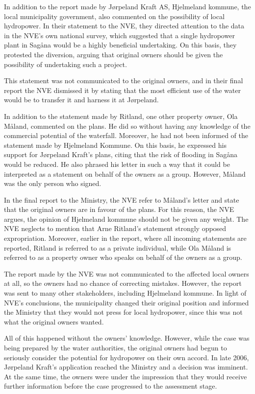 In addition to the report made by Jørpeland Kraft AS, Hjelmeland kommune, the local municipality government, also commented on the possibility of local hydropower. In their statement to the NVE, they directed attention to the data in the NVE's own national survey, which suggested that a single hydropower plant in Sagåna would be a highly beneficial undertaking. On this basis, they protested the diversion, arguing that original owners should be given the possibility of undertaking such a project. 

This statement was not communicated to the original owners, and in their final report the NVE dismissed it by stating that the most efficient use of the water would be to transfer it and harness it at Jørpeland.

In addition to the statement made by Ritland, one other property owner, Ola Måland, commented on the plans. He did so without having any knowledge of the commercial potential of the waterfall. Moreover, he had not been informed of the statement made by Hjelmeland Kommune. On this basis, he expressed his support for Jørpeland Kraft's plans, citing that the risk of flooding in Sagåna would be reduced. He also phrased his letter in such a way that it could be interpreted as a statement on behalf of the owners as a group. However, Måland was the only person who signed.

In the final report to the Ministry, the NVE refer to Måland's letter and state that the original owners are in favour of the plans. For this reason, the NVE argues, the opinion of Hjelmeland kommune should not be given any weight. The NVE neglects to mention that Arne Ritland's statement strongly opposed expropriation. Moreover, earlier in the report, where all incoming statements are reported, Ritland is referred to as a private individual, while Ola Måland is referred to as a property owner who speaks on behalf of the owners as a group.

The report made by the NVE was not communicated to the affected local owners at all, so the owners had no chance of correcting mistakes. However, the report was sent to many other stakeholders, including Hjelmeland kommune. In light of NVE's conclusions, the municipality changed their original position and informed the Ministry that they would not press for local hydropower, since this was not what the original owners wanted.

All of this happened without the owners' knowledge. However, while the case was being prepared by the water authorities, the original owners had begun to seriously consider the potential for hydropower on their own accord. In late 2006, Jørpeland Kraft's application reached the Ministry and a decision was imminent. At the same time, the owners were under the impression that they would receive further information before the case progressed to the assessment stage. 

